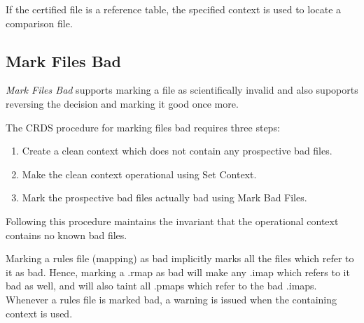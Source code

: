 \documentclass[letterpaper,10pt,english]{sphinxmanual}
\begin{document}
If the certified file is a reference table,  the specified context is used to
locate a comparison file.


\subsection{Mark Files Bad}
\label{web_site_use:mark-files-bad}
\emph{Mark Files Bad} supports marking a file as scientifically invalid and
also supoports reversing the decision and marking it good once more.

The CRDS procedure for marking files bad requires three steps:
\begin{enumerate}
\item {} 
Create a clean context which does not contain any prospective bad files.

\item {} 
Make the clean context operational using Set Context.

\item {} 
Mark the prospective bad files actually bad using Mark Bad Files.

\end{enumerate}

Following this procedure maintains the invariant that the operational context
contains no known bad files.
\begin{figure}[htbp]
\centering

\end{figure}

Marking a rules file (mapping) as bad implicitly marks all the files
which refer to it as bad.  Hence,  marking a .rmap as bad will make
any .imap which refers to it bad as well,  and will also taint all .pmaps
which refer to the bad .imaps.   Whenever a rules file is marked bad,
a warning is issued when the containing context is used.
\end{document}
